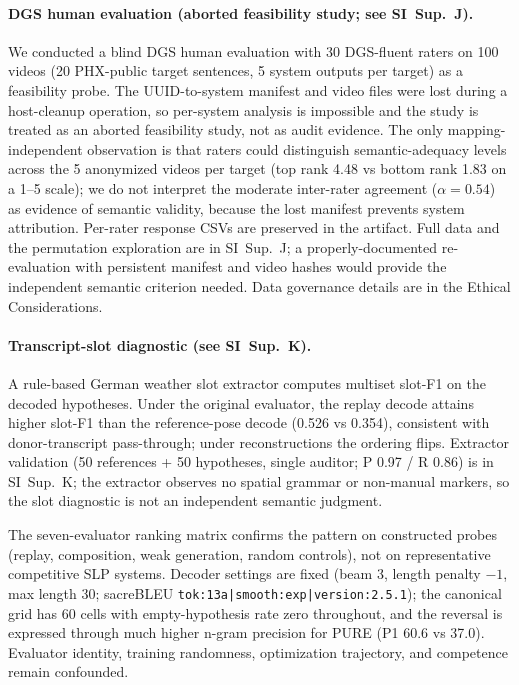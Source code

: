 \documentclass[pdflatex,sn-chicago]{sn-jnl}
\begin{document}
\paragraph{DGS human evaluation (aborted feasibility study; see SI~Sup.~J).}
\label{sec:human_eval_feasibility}
We conducted a blind DGS human evaluation with 30 DGS-fluent raters on 100 videos (20 PHX-public target sentences, 5 system outputs per target) as a feasibility probe. The UUID-to-system manifest and video files were lost during a host-cleanup operation, so per-system analysis is impossible and the study is treated as an aborted feasibility study, not as audit evidence. The only mapping-independent observation is that raters could distinguish semantic-adequacy levels across the 5 anonymized videos per target (top rank 4.48 vs bottom rank 1.83 on a 1--5 scale); we do not interpret the moderate inter-rater agreement ($\alpha = 0.54$) as evidence of semantic validity, because the lost manifest prevents system attribution. Per-rater response CSVs are preserved in the artifact. Full data and the permutation exploration are in SI~Sup.~J; a properly-documented re-evaluation with persistent manifest and video hashes would provide the independent semantic criterion needed. Data governance details are in the Ethical Considerations.


\paragraph{Transcript-slot diagnostic (see SI~Sup.~K).}
\label{sec:slot_f1}
A rule-based German weather slot extractor computes multiset slot-F1 on the decoded hypotheses. Under the original evaluator, the replay decode attains higher slot-F1 than the reference-pose decode (0.526 vs 0.354), consistent with donor-transcript pass-through; under reconstructions the ordering flips. Extractor validation (50 references + 50 hypotheses, single auditor; P 0.97 / R 0.86) is in SI~Sup.~K; the extractor observes no spatial grammar or non-manual markers, so the slot diagnostic is not an independent semantic judgment.

The seven-evaluator ranking matrix confirms the pattern on constructed probes (replay, composition, weak generation, random controls), not on representative competitive SLP systems. Decoder settings are fixed (beam 3, length penalty $-1$, max length 30; sacreBLEU \texttt{tok:13a|smooth:exp|version:2.5.1}); the canonical grid has 60 cells with empty-hypothesis rate zero throughout, and the reversal is expressed through much higher n-gram precision for PURE (P1 60.6 vs 37.0). Evaluator identity, training randomness, optimization trajectory, and competence remain confounded.
\end{document}
